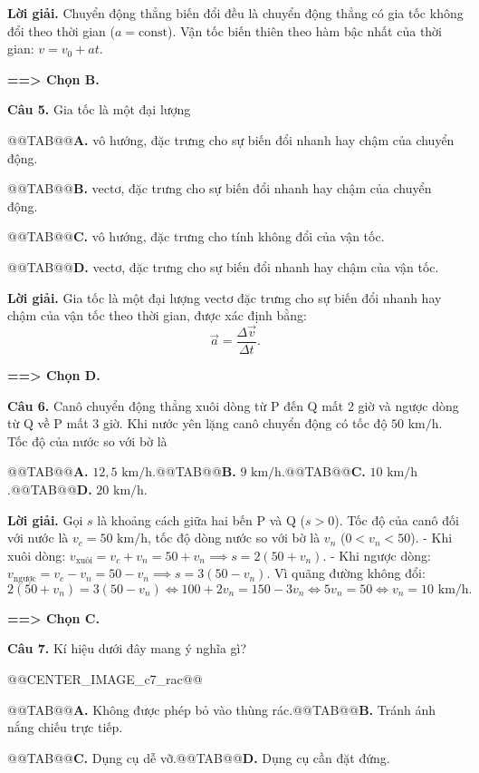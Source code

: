 \documentclass[11pt,a4paper]{article}
\begin{document}
\textbf{Lời giải.} Chuyển động thẳng biến đổi đều là chuyển động thẳng có gia tốc không đổi theo thời gian ($a = \text{const}$). Vận tốc biến thiên theo hàm bậc nhất của thời gian: $v = v_0 + at$.

\textbf{==> Chọn B.}

\textbf{Câu 5.} Gia tốc là một đại lượng

@@TAB@@\textbf{A.} vô hướng, đặc trưng cho sự biến đổi nhanh hay chậm của chuyển động.

@@TAB@@\textbf{B.} vectơ, đặc trưng cho sự biến đổi nhanh hay chậm của chuyển động.

@@TAB@@\textbf{C.} vô hướng, đặc trưng cho tính không đổi của vận tốc.

@@TAB@@\textbf{D.} vectơ, đặc trưng cho sự biến đổi nhanh hay chậm của vận tốc.

\textbf{Lời giải.} Gia tốc là một đại lượng vectơ đặc trưng cho sự biến đổi nhanh hay chậm của vận tốc theo thời gian, được xác định bằng:
\[
\vec{a} = \frac{\Delta \vec{v}}{\Delta t}.
\]

\textbf{==> Chọn D.}

\textbf{Câu 6.} Canô chuyển động thẳng xuôi dòng từ P đến Q mất 2 giờ và ngược dòng từ Q về P mất 3 giờ. Khi nước yên lặng canô chuyển động có tốc độ $50\text{ km/h}$. Tốc độ của nước so với bờ là

@@TAB@@\textbf{A.} $12{,}5\text{ km/h}$.@@TAB@@\textbf{B.} $9\text{ km/h}$.@@TAB@@\textbf{C.} $10\text{ km/h}$.@@TAB@@\textbf{D.} $20\text{ km/h}$.

\textbf{Lời giải.} Gọi $s$ là khoảng cách giữa hai bến P và Q ($s > 0$). Tốc độ của canô đối với nước là $v_c = 50\text{ km/h}$, tốc độ dòng nước so với bờ là $v_n$ ($0 < v_n < 50$).
- Khi xuôi dòng: $v_{\text{xuôi}} = v_c + v_n = 50 + v_n \implies s = 2(50 + v_n)$.
- Khi ngược dòng: $v_{\text{ngược}} = v_c - v_n = 50 - v_n \implies s = 3(50 - v_n)$.
Vì quãng đường không đổi:
\[
2(50 + v_n) = 3(50 - v_n) \iff 100 + 2v_n = 150 - 3v_n \iff 5v_n = 50 \iff v_n = 10\text{ km/h}.
\]

\textbf{==> Chọn C.}

\textbf{Câu 7.} Kí hiệu dưới đây mang ý nghĩa gì?

@@CENTER_IMAGE_c7_rac@@

@@TAB@@\textbf{A.} Không được phép bỏ vào thùng rác.@@TAB@@\textbf{B.} Tránh ánh nắng chiếu trực tiếp.

@@TAB@@\textbf{C.} Dụng cụ dễ vỡ.@@TAB@@\textbf{D.} Dụng cụ cần đặt đứng.
\end{document}

